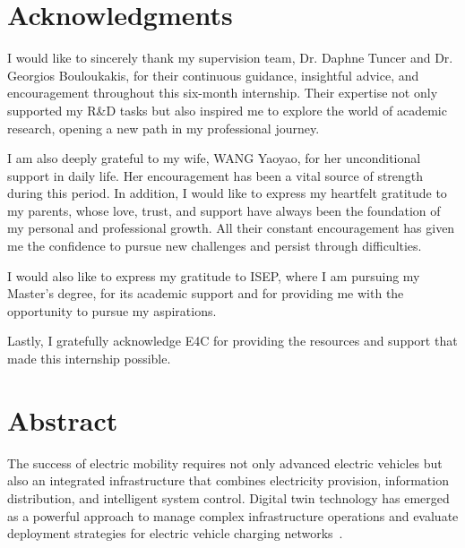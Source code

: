 \documentclass[11pt]{memoir}
\begin{document}
\setcounter{secnumdepth}{3}
\thispagestyle{empty}




\chapter*{Acknowledgments}

I would like to sincerely thank my supervision team, Dr. Daphne Tuncer and Dr. Georgios Bouloukakis, for their continuous guidance, insightful advice, and encouragement throughout this six-month internship. Their expertise not only supported my R\&D tasks but also inspired me to explore the world of academic research, opening a new path in my professional journey.

I am also deeply grateful to my wife, WANG Yaoyao, for her unconditional support in daily life. Her encouragement has been a vital source of strength during this period. In addition, I would like to express my heartfelt gratitude to my parents, whose love, trust, and support have always been the foundation of my personal and professional growth. All their constant encouragement has given me the confidence to pursue new challenges and persist through difficulties.

I would also like to express my gratitude to ISEP, where I am pursuing my Master's degree, for its academic support and for providing me with the opportunity to pursue my aspirations.

Lastly, I gratefully acknowledge E4C for providing the resources and support that made this internship possible.



\newpage



\chapter*{Abstract}

The success of electric mobility requires not only advanced electric vehicles but also an integrated infrastructure that combines electricity provision, information distribution, and intelligent system control. Digital twin technology has emerged as a powerful approach to manage complex infrastructure operations and evaluate deployment strategies for electric vehicle charging networks~\cite{Yu2024}.
\end{document}
